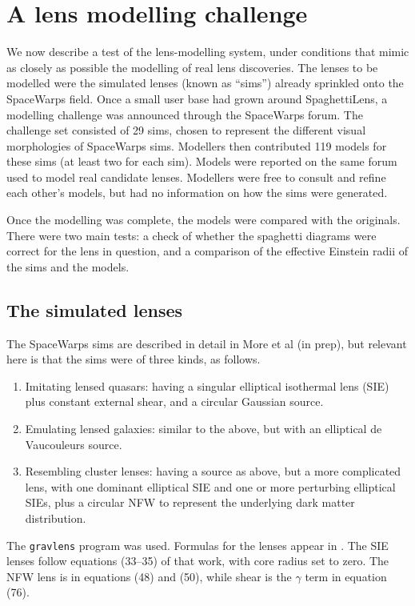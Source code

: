 \documentclass[usenatbib]{mn2e}
\newcommand{\spl}{SpaghettiLens\xspace}
\newcommand{\sw}{SpaceWarps\xspace}
\begin{document}

\section{A lens modelling challenge} \label{sec:mod_challenge}

We now describe a test of the lens-modelling system, under conditions
that mimic as closely as possible the modelling of real lens
discoveries.  The lenses to be modelled were the simulated lenses
(known as ``sims'') already sprinkled onto the \sw field.  Once a
small user base had grown around \spl, a modelling challenge was
announced through the \sw forum.  The challenge set consisted of 29
sims, chosen to represent the different visual morphologies of \sw
sims. Modellers then contributed 119 models for these sims (at least
two for each sim).  Models were reported on the same forum used to
model real candidate lenses.  Modellers were free to consult and
refine each other's models, but had no information on how the sims
were generated.

Once the modelling was complete, the models were compared with the
originals.  There were two main tests: a check of whether the
spaghetti diagrams were correct for the lens in question, and a
comparison of the effective Einstein radii of the sims and the models.



\subsection{The simulated lenses} \label{sec:sims}

The \sw sims are described in detail in More et al (in prep), but
relevant here is that the sims were of three kinds, as follows.

\begin{enumerate}
  \item Imitating lensed quasars: having a singular elliptical
    isothermal lens (SIE) plus constant external shear, and a circular
    Gaussian source.
  \item Emulating lensed galaxies: similar to the above, but with an
    elliptical de Vaucouleurs source.
  \item Resembling cluster lenses: having a source as above, but a
    more complicated lens, with one dominant elliptical SIE and
    one or more perturbing elliptical SIEs, plus a circular NFW
    \citep{1996ApJ...462..563N,1997ApJ...490..493N} to represent
    the underlying dark matter distribution.
\end{enumerate}
The {\tt gravlens} program \citep{2001astro.ph..2340K} was used.
Formulas for the lenses appear in \cite{2001astro.ph..2341K}. The SIE
lenses follow equations (33--35) of that work, with core radius set to
zero.  The NFW lens is in equations (48) and (50), while shear is the
$\gamma$ term in equation (76).
\end{document}
